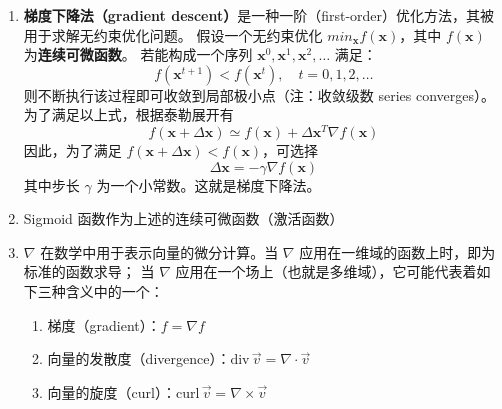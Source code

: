 \documentclass[../studies-ml.tex]{subfiles}
\begin{document}
\begin{enumerate}[I]
  \item \textbf{梯度下降法（gradient descent）}是一种一阶（first-order）优化方法，其被用于求解无约束优化问题。
        假设一个无约束优化 $min_{\pmb{x}} f(\pmb{x})$，其中 $f(\pmb{x})$ 为\textbf{连续可微函数}。
        若能构成一个序列 $\pmb{x}^0,\pmb{x}^1,\pmb{x}^2,\dots$ 满足：
        \begin{equation*}
          f(\pmb{x}^{t+1}) < f(\pmb{x}^{t}),\quad t = 0,1,2,\dots
        \end{equation*}
        则不断执行该过程即可收敛到局部极小点（注：收敛级数 series converges）。为了满足以上式，根据泰勒展开有
        \begin{equation*}
          f(\pmb{x} + \Delta\pmb{x}) \simeq f(\pmb{x}) + \Delta \pmb{x}^T \nabla f(\pmb{x})
        \end{equation*}
        因此，为了满足 $f(\pmb{x} + \Delta\pmb{x}) < f(\pmb{x})$，可选择
        \begin{equation*}
          \Delta \pmb{x} = -\gamma \nabla f(\pmb{x})
        \end{equation*}
        其中步长 $\gamma$ 为一个小常数。这就是梯度下降法。

  \item Sigmoid 函数作为上述的连续可微函数（激活函数）
        \begin{center}
        \end{center}

  \item $\nabla$ 在数学中用于表示向量的微分计算。当 $\nabla$ 应用在一维域的函数上时，即为标准的函数求导；
        当 $\nabla$ 应用在一个场上（也就是多维域），它可能代表着如下三种含义中的一个：
        \begin{enumerate}[i]
          \item 梯度（gradient）：$f = \nabla f$
          \item 向量的发散度（divergence）：$\textrm{div}\, \overrightarrow{v} = \nabla \cdot \overrightarrow{v}$
          \item 向量的旋度（curl）：$\textrm{curl}\, \overrightarrow{v} = \nabla \times \overrightarrow{v}$
        \end{enumerate}
\end{enumerate}
\end{document}
